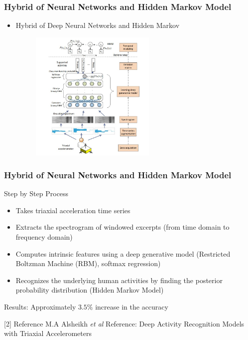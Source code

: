 \documentclass{beamer} %
\begin{document}
\begin{frame}
\frametitle{Hybrid of Neural Networks and Hidden Markov Model}

\begin{itemize}
\item Hybrid of Deep Neural Networks and Hidden Markov 

 \begin{figure}[htbp] 
	
	\begin{center}
		\includegraphics[width=6cm]{./image/a2} 	
	\end{center}
\end{figure}

\end{itemize}

\end{frame}

\begin{frame}
\frametitle{Hybrid of Neural Networks and Hidden Markov Model}
Step by Step Process
\begin{itemize}
\item[(1)] Takes triaxial acceleration time series 
\item[(2)] Extracts the spectrogram of windowed excerpts (from time domain to frequency domain) 
\item[(3)] Computes intrinsic features using a deep
generative model (Restricted Boltzman Machine (RBM), softmax regression)
\item[(4)] Recognizes the underlying
human activities by finding the posterior probability distribution (Hidden Markov Model)

\end{itemize}

Results: Approximately $3.5\%$ increase in the accuracy

\vspace{2em}
\scriptsize [2] Reference M.A Alsheikh \textit{et al} Reference: Deep Activity Recognition Models with Triaxial Accelerometers 

\end{frame}
\end{document}
